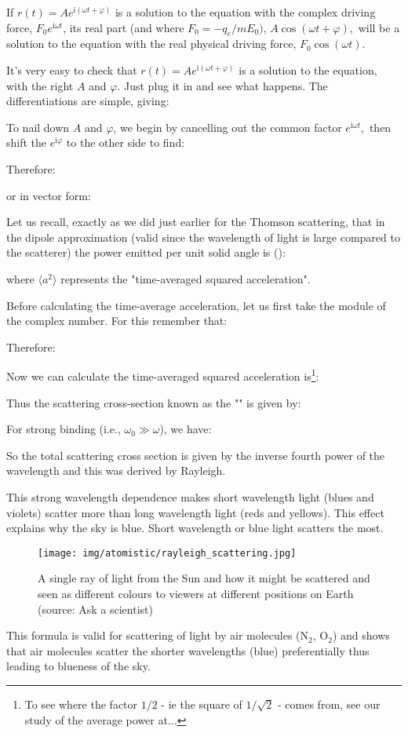 	\begin{tcolorbox}[title=Remark,colframe=black,arc=10pt]
	If $r(t)=A e^{\mathrm{i}(\omega t+\varphi)}$ is a solution to the equation with the complex driving force, $F_{0} e^{\mathrm{i} \omega t}$, its real part (and where $F_0=-q_e/m E_0)$, $A \cos (\omega t+\varphi),$ will be a solution to the equation with the real physical driving force, $F_{0} \cos( \omega t)$.
	\end{tcolorbox}
	It's very easy to check that $r(t)=A e^{\mathrm{i}(\omega t+\varphi)}$ is a solution to the equation, with the right $A$ and $\varphi$. Just plug it in and see what happens. The differentiations are simple, giving:
	
	To nail down $A$ and $\varphi$, we begin by cancelling out the common factor $e^{\mathrm{i} \omega t},$ then shift the $e^{\mathrm{i} \varphi}$ to the other side to
find:
	
	Therefore:
	
	or in vector form:
	
	Let us recall, exactly as we did just earlier for the Thomson scattering, that in the dipole approximation (valid since the wavelength of light is large compared to the scatterer) the power emitted per unit solid angle is ():
	
	where $\langle a^2 \rangle$ represents the "time-averaged squared acceleration". 
	
	Before calculating the time-average acceleration, let us first take the module of the complex number. For this remember that:
	
	Therefore:
	
	Now we can calculate the time-averaged squared acceleration is\footnote{To see where the factor $1/2$ - ie the square of  $1/\sqrt{2}$ - comes from, see our study of the average power at...}:
	
	Thus the scattering cross-section known as the "" is given by:
	
	For strong binding (i.e., $\omega_0 \gg \omega$), we have:
	
	So the total scattering cross section is given by the inverse fourth power of the wavelength and this was derived by Rayleigh.
	
	This strong wavelength dependence makes short wavelength light (blues and violets)  scatter more than long wavelength light (reds and yellows). This effect explains why the sky is blue. Short wavelength or blue light scatters the most.
	\begin{figure}[H]
		\centering
		\texttt{[image: img/atomistic/rayleigh\_scattering.jpg]}
		\caption[Why the sky is blue]{A single ray of light from the Sun and how it might be scattered and seen as different colours to viewers at different positions on Earth (source: Ask a scientist)}
	\end{figure} 
	This formula is valid for scattering of light by air molecules ($\mathrm{N}_2$, $\mathrm{O}_2$) and shows that air molecules scatter the shorter wavelengths (blue) preferentially thus leading to blueness of the sky.
	
